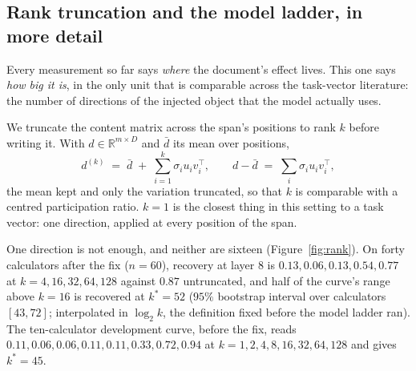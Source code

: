 \documentclass{article}
\newcommand{\dvec}{\ensuremath{d}}
\begin{document}
\begin{table}[h]
\caption{The channel and the truncation curve at three model widths, each with
its own restricted split and its own injection layer at matched relative depth.
$\rho$ is Eq.~\ref{eq:rho}; \emph{gold} is what the document itself is worth on
that model's restricted items, which is why the $0.6$B and $1.7$B rows have low
absolute accuracy and a large $n$: those models solve almost nothing without the
document, so almost every item qualifies. Qwen3-0.6B and Qwen3-8B are after the
instrument fix; Qwen3-1.7B is before it, and its curve is not monotone, so its
$k^{*}$ is not interpretable. $k^{*}$ sits between $32$ and $64$ at $d=1024$
and at $d=4096$ alike; a width-proportional account predicts $k\approx12$ for
the first. Mistral-7B is in Table~\ref{tab:replicationfull}.}
\label{tab:laddermodels}
\centering
\footnotesize
\setlength{\tabcolsep}{3pt}

\end{table}

\subsection{Rank truncation and the model ladder, in more detail}
\label{app:rank2}

Every measurement so far says \emph{where} the document's effect lives. This one
says \emph{how big it is}, in the only unit that is comparable across the
task-vector literature: the number of directions of the injected object that the
model actually uses.

We truncate the content matrix across the span's positions to rank $k$ before
writing it. With $\dvec \in \mathbb{R}^{m \times D}$ and $\bar{\dvec}$ its mean
over positions,
\begin{equation}
\dvec^{(k)} \;=\; \bar{\dvec} \;+\; \sum_{i=1}^{k} \sigma_i u_i v_i^{\top},
\qquad
\dvec - \bar{\dvec} \;=\; \textstyle\sum_i \sigma_i u_i v_i^{\top},
\end{equation}
the mean kept and only the variation truncated, so that $k$ is comparable with a
centred participation ratio. $k=1$ is the closest thing in this setting to a
task vector: one direction, applied at every position of the span.

One direction is not enough, and neither are sixteen
(Figure~\ref{fig:rank}). On forty calculators after the fix ($n=60$), recovery
at layer $8$ is $0.13, 0.06, 0.13, 0.54, 0.77$ at $k = 4, 16, 32, 64, 128$
against $0.87$ untruncated, and half of the curve's range above $k=16$ is
recovered at $k^{*}=52$ ($95\%$ bootstrap interval over calculators $[43, 72]$;
interpolated in $\log_2 k$, the definition fixed before the model ladder ran).
The ten-calculator development curve, before the fix, reads
$0.11, 0.06, 0.06, 0.11, 0.11, 0.33, 0.72, 0.94$ at $k = 1,2,4,8,16,32,64,128$
and gives $k^{*}=45$.
\end{document}
